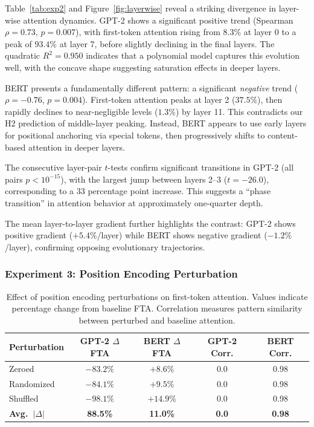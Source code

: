 \documentclass{article}
\begin{document}
Table~\ref{tab:exp2} and Figure~\ref{fig:layerwise} reveal a striking divergence in layer-wise attention dynamics. GPT-2 shows a significant positive trend (Spearman $\rho = 0.73$, $p = 0.007$), with first-token attention rising from $8.3\%$ at layer 0 to a peak of $93.4\%$ at layer 7, before slightly declining in the final layers. The quadratic $R^2 = 0.950$ indicates that a polynomial model captures this evolution well, with the concave shape suggesting saturation effects in deeper layers.

BERT presents a fundamentally different pattern: a significant \emph{negative} trend ($\rho = -0.76$, $p = 0.004$). First-token attention peaks at layer 2 ($37.5\%$), then rapidly declines to near-negligible levels ($1.3\%$) by layer 11. This contradicts our H2 prediction of middle-layer peaking. Instead, BERT appears to use early layers for positional anchoring via special tokens, then progressively shifts to content-based attention in deeper layers.

The consecutive layer-pair $t$-tests confirm significant transitions in GPT-2 (all pairs $p < 10^{-15}$), with the largest jump between layers 2--3 ($t = -26.0$), corresponding to a 33 percentage point increase. This suggests a ``phase transition'' in attention behavior at approximately one-quarter depth.

The mean layer-to-layer gradient further highlights the contrast: GPT-2 shows positive gradient ($+5.4\%$/layer) while BERT shows negative gradient ($-1.2\%$/layer), confirming opposing evolutionary trajectories.

\subsubsection{Experiment 3: Position Encoding Perturbation}

\begin{table}[t]
\centering
\caption{Effect of position encoding perturbations on first-token attention. Values indicate percentage change from baseline FTA. Correlation measures pattern similarity between perturbed and baseline attention.}
\label{tab:exp3}
\begin{tabular}{lcccc}
\toprule
\textbf{Perturbation} & \textbf{GPT-2 $\Delta$FTA} & \textbf{BERT $\Delta$FTA} & \textbf{GPT-2 Corr.} & \textbf{BERT Corr.} \\
\midrule
Zeroed      & $-83.2\%$ & $+8.6\%$  & 0.0 & 0.98 \\
Randomized  & $-84.1\%$ & $+9.5\%$  & 0.0 & 0.98 \\
Shuffled    & $-98.1\%$ & $+14.9\%$ & 0.0 & 0.98 \\
\midrule
\textbf{Avg.\ $|\Delta|$} & \textbf{88.5\%} & \textbf{11.0\%} & \textbf{0.0} & \textbf{0.98} \\
\bottomrule
\end{tabular}
\end{table}
\end{document}
